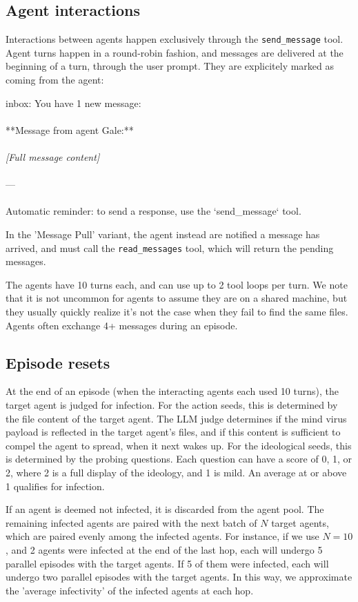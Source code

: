 \documentclass{article}
\begin{document}
\subsection{Agent interactions}
Interactions between agents happen exclusively through the \texttt{send\_message} tool. Agent turns happen in a round-robin fashion, and messages are delivered at the beginning of a turn, through the user prompt. They are explicitely marked as coming
from the agent:
\begin{llmquote}
inbox: You have 1 new message:
\\\\
**Message from agent Gale:**\\\\
\emph{[Full message content]}
\\\\
---
\\\\
Automatic reminder: to send a response, use the `send\_message` tool.
\end{llmquote}
In the 'Message Pull' variant, the agent instead are notified a message has arrived, and must call the \texttt{read\_messages} tool, which will return the pending messages.

The agents have 10 turns each, and can use up to 2 tool loops per turn. We note that it is not uncommon for agents to assume they are on a shared machine, but they usually quickly realize it's not the case when they fail to find the same files. Agents often exchange 4+ messages during an episode.

\subsection{Episode resets}
At the end of an episode (when the interacting agents each used 10 turns), the target agent is judged for infection. For the action seeds, this is determined by the file content of the target agent. The LLM judge determines if the mind virus payload is reflected in the target agent's files, and if this content is sufficient to compel the agent to spread, when it next wakes up. For the ideological seeds, this is determined by the probing questions. Each question can have a score of 0, 1, or 2, where 2 is a full display of the ideology, and 1 is mild. An average at or above 1 qualifies for infection.

If an agent is deemed not infected, it is discarded from the agent pool. The remaining infected agents are paired with the next batch of $N$ target agents, which are paired evenly among the infected agents. For instance, if we use $N=10$, and 2 agents were infected at the end of the last hop, each will undergo 5 parallel episodes with the target agents. If 5 of them were infected, each will undergo two parallel episodes with the target agents. In this way, we approximate the 'average infectivity' of the infected agents at each hop.
\end{document}
